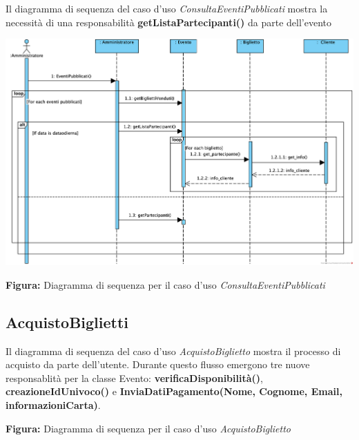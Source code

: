 \begin{center}
    Il diagramma di sequenza del caso d'uso \textit{ConsultaEventiPubblicati} mostra la necessità di una responsabilità \textbf{getListaPartecipanti()} da parte dell'evento

    \vspace{2ex}
    \includegraphics[width=0.8\linewidth]{assets/casid'uso/ConsultaInformazioniEvento.png}

    \vspace{1ex}
    \textbf{Figura:} Diagramma di sequenza per il caso d’uso \textit{ConsultaEventiPubblicati}
\end{center}


\newpage
{
\subsection{AcquistoBiglietti}

\begin{center}
Il diagramma di sequenza del caso d’uso \textit{AcquistoBiglietto} mostra il processo di acquisto da parte dell’utente. Durante questo flusso emergono tre nuove responsablità per la classe Evento: \textbf{verificaDisponibilità()}, \textbf{creazioneIdUnivoco()} e \textbf{InviaDatiPagamento(Nome, Cognome, Email, informazioniCarta)}. 
\vspace*{2mm}

\vspace{1ex}
\textbf{Figura:} Diagramma di sequenza per il caso d’uso \textit{AcquistoBiglietto}
\end{center}
}

